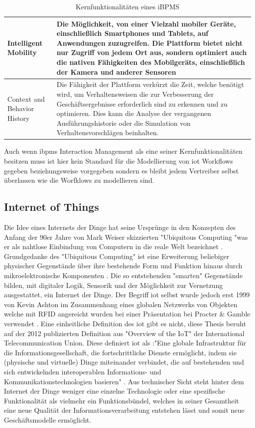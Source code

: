 \documentclass[a4paper, 12pt, twoside, headsepline=true]{scrartcl} %
\begin{document}
\begin{table}[H]
\begin{tabularx}{\textwidth}{@{}lL@{}}
		\\ \hline
		Intelligent Mobility & Die Möglichkeit, von einer Vielzahl mobiler Geräte, einschließlich Smartphones und Tablets, auf Anwendungen zuzugreifen. Die Plattform bietet nicht nur Zugriff von jedem Ort aus, sondern optimiert auch die nativen Fähigkeiten des Mobilgeräts, einschließlich der Kamera und anderer Sensoren
		\\ \hline
		Context and Behavior History & Die Fähigkeit der Plattform verkürzt die Zeit, welche benötigt wird, um Verhaltensweisen die zur Verbesserung der Geschäftsergebnisse erforderlich sind zu erkennen und zu optimieren. Dies kann die Analyse der vergangenen Ausführungshistorie oder die Simulation von Verhaltensvorschlägen beinhalten.
		\\ \hline
		\bottomrule
	\end{tabularx}
\caption{Kernfunktionalitäten eines iBPMS \cite{ibpms}}
\label{table:GartnerIBPMS}
\end{table}

Auch wenn \ac{ibpms} Interaction Management als eine seiner Kernfunktionalitäten besitzen muss ist hier kein Standard für die Modellierung von \ac{iot} Workflows gegeben beziehungsweise vorgegeben sondern es bleibt jedem Vertreiber selbst überlassen wie die Worfklows zu modellieren sind.

\subsection{Internet of Things}

Die Idee eines Internets der Dinge hat seine Ursprünge in den Konzepten des Anfang der 90er Jahre von Mark Weiser skizzierten "Ubiquitous Computing "was er als nahtlose Einbindung von Computern in die reale Welt bezeichnet \cite{ucweiser}. 
Grundgedanke des "Ubiquitous Computing" ist eine Erweiterung beliebiger physischer Gegenstände über ihre bestehende Form und Funktion hinaus durch mikroelektronische Komponenten \cite{237456}. Die so entstehenden "smarten" Gegenstände bilden, mit digitaler Logik, Sensorik und der Möglichkeit zur Vernetzung ausgestattet, ein Internet der Dinge. Der Begriff \acl{iot} selbst wurde jedoch erst 1999 von Kevin Ashton im Zusammenhang eines globalen Netzwerks von Objekten welche mit RFID angereicht wurden bei einer Präsentation bei Procter \& Gamble verwendet \cite{rfidiot}. Eine einheitliche Definition des \ac{iot} gibt es nicht, diese Thesis beruht auf der 2012 publizierten Definition aus "Overview of the IoT" der International Telecommunication Union. Diese definiert \ac{iot} als :"Eine globale Infrastruktur für die Informationsgesellschaft, die fortschrittliche Dienste ermöglicht, indem sie (physische und virtuelle) Dinge miteinander verbindet, die auf bestehenden und sich entwickelnden interoperablen Informations- und Kommunikationstechnologien basieren" \cite{iotdefinition}.
Aus technischer Sicht steht hinter dem Internet der Dinge weniger eine einzelne Technologie oder eine spezifische Funktionalität als vielmehr ein Funktionsbündel, welches in seiner Gesamtheit eine neue Qualität der Informationsverarbeitung entstehen lässt und somit neue Geschäftsmodelle ermöglicht.
\end{document}
